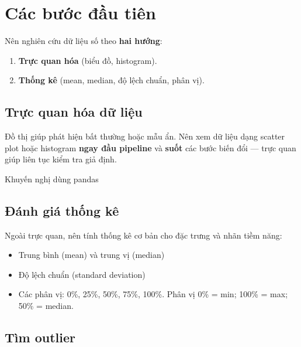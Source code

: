 \documentclass[12pt,a4paper]{article}
\begin{document}
\section{Các bước đầu tiên}

\begin{phuongphap}[title={Trước khi tạo feature vector}]
Nên nghiên cứu dữ liệu số theo \textbf{hai hướng}:
\begin{enumerate}
  \item \textbf{Trực quan hóa} (biểu đồ, histogram).
  \item \textbf{Thống kê} (mean, median, độ lệch chuẩn, phân vị).
\end{enumerate}
\end{phuongphap}

\subsection{Trực quan hóa dữ liệu}

\begin{ynghia}
Đồ thị giúp phát hiện bất thường hoặc mẫu ẩn. Nên xem dữ liệu dạng scatter plot hoặc histogram \textbf{ngay đầu pipeline} và \textbf{suốt} các bước biến đổi --- trực quan giúp liên tục kiểm tra giả định.
\end{ynghia}

\begin{luuy}
Khuyến nghị dùng pandas
\end{luuy}

\subsection{Đánh giá thống kê}

\begin{ynghia}
Ngoài trực quan, nên tính thống kê cơ bản cho đặc trưng và nhãn tiềm năng:
\begin{itemize}
  \item Trung bình (mean) và trung vị (median)
  \item Độ lệch chuẩn (standard deviation)
  \item Các phân vị: 0\%, 25\%, 50\%, 75\%, 100\%. Phân vị 0\% = min; 100\% = max; 50\% = median.
\end{itemize}
\end{ynghia}

\subsection{Tìm outlier}
\end{document}
